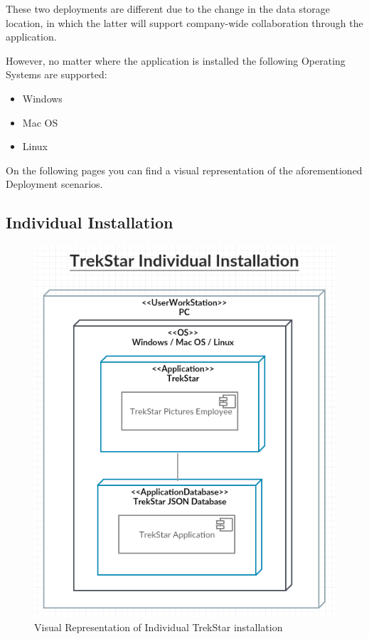 \documentclass[
  english,
  a4paper,
,tablecaptionabove
]{scrartcl}
\providecommand{\tightlist}{%
  \setlength{\itemsep}{0pt}\setlength{\parskip}{0pt}}
\begin{document}
These two deployments are different due to the change in the data
storage location, in which the latter will support company-wide
collaboration through the application.

However, no matter where the application is installed the following
Operating Systems are supported:

\begin{itemize}
\tightlist
\item
  Windows
\item
  Mac OS
\item
  Linux
\end{itemize}

On the following pages you can find a visual representation of the
aforementioned Deployment scenarios.

\hypertarget{individual-installation}{%
\subsection{Individual Installation}\label{individual-installation}}

\begin{figure}
\centering
\includegraphics{images/deployment-diagrams/trekstar-individual-installation.png}
\caption{Visual Representation of Individual TrekStar installation}
\end{figure}
\end{document}
